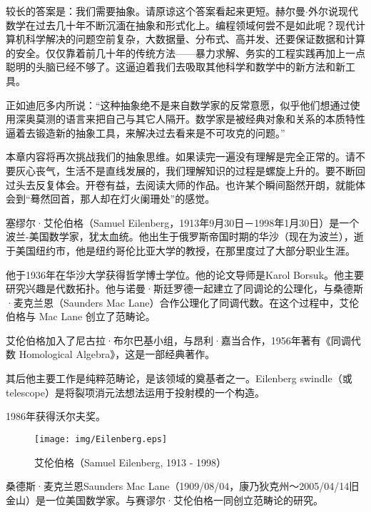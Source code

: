 \documentclass{article}
\begin{document}
较长的答案是：我们需要抽象。请原谅这个答案看起来更短。赫尔曼$\cdot$外尔说现代数学在过去几十年不断沉湎在抽象和形式化上。编程领域何尝不是如此呢？现代计算机科学解决的问题空前复杂，大数据量、分布式、高并发、还要保证数据和计算的安全。仅仅靠着前几十年的传统方法——暴力求解、务实的工程实践再加上一点聪明的头脑已经不够了。这逼迫着我们去吸取其他科学和数学中的新方法和新工具。

正如迪厄多内所说：“这种抽象绝不是来自数学家的反常意愿，似乎他们想通过使用深奥莫测的语言来把自己与其它人隔开。数学家是被经典对象和关系的本质特性逼着去锻造新的抽象工具，来解决过去看来是不可攻克的问题。”\cite{Dieudonne1987}

本章内容将再次挑战我们的抽象思维。如果读完一遍没有理解是完全正常的。请不要灰心丧气，生活不是直线发展的，我们理解知识的过程是螺旋上升的。要不断回过头去反复体会。开卷有益，去阅读大师的作品。也许某个瞬间豁然开朗，就能体会到“蓦然回首，那人却在灯火阑珊处”的感觉。

塞缪尔·艾伦伯格（Samuel Eilenberg，1913年9月30日－1998年1月30日）是一个波兰-美国数学家，犹太血统。他出生于俄罗斯帝国时期的华沙（现在为波兰），逝于美国纽约市，他是纽约哥伦比亚大学的教授，在那里度过了大部分职业生涯。

他于1936年在华沙大学获得哲学博士学位。他的论文导师是Karol Borsuk。他主要研究兴趣是代数拓扑。他与诺曼·斯廷罗德一起建立了同调论的公理化，与桑德斯·麦克兰恩（Saunders Mac Lane）合作公理化了同调代数。在这个过程中，艾伦伯格与 Mac Lane 创立了范畴论。

艾伦伯格加入了尼古拉·布尔巴基小组，与昂利·嘉当合作，1956年著有《同调代数 Homological Algebra》，这是一部经典著作。

其后他主要工作是纯粹范畴论，是该领域的奠基者之一。Eilenberg swindle（或 telescope）是将裂项消元法想法运用于投射模的一个构造。

1986年获得沃尔夫奖。

\begin{wrapfigure}{R}{0.3\textwidth}
 \centering
 \texttt{[image: img/Eilenberg.eps]}
 \captionsetup{labelformat=empty}
 \caption{艾伦伯格（Samuel Eilenberg, 1913 - 1998）}
 \label{fig:Pythagoras}
\end{wrapfigure}

桑德斯·麦克兰恩Saunders Mac Lane（1909/08/04，康乃狄克州～2005/04/14旧金山）是一位美国数学家。与赛谬尔·艾伦伯格一同创立范畴论的研究。
\end{document}
